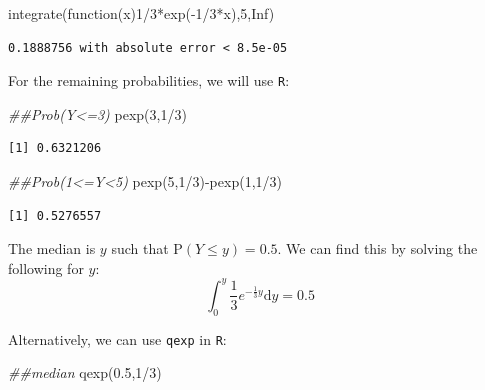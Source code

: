 \documentclass[
  letterpaper,
  DIV=11,
  numbers=noendperiod]{scrreprt}
\newenvironment{Shaded}{\begin{snugshade}}{\end{snugshade}}
\newcommand{\ConstantTok}[1]{\textcolor[rgb]{0.56,0.35,0.01}{#1}}
\newcommand{\ControlFlowTok}[1]{\textcolor[rgb]{0.00,0.23,0.31}{#1}}
\newcommand{\DecValTok}[1]{\textcolor[rgb]{0.68,0.00,0.00}{#1}}
\newcommand{\DocumentationTok}[1]{\textcolor[rgb]{0.37,0.37,0.37}{\textit{#1}}}
\newcommand{\FloatTok}[1]{\textcolor[rgb]{0.68,0.00,0.00}{#1}}
\newcommand{\FunctionTok}[1]{\textcolor[rgb]{0.28,0.35,0.67}{#1}}
\newcommand{\NormalTok}[1]{\textcolor[rgb]{0.00,0.23,0.31}{#1}}
\newcommand{\SpecialCharTok}[1]{\textcolor[rgb]{0.37,0.37,0.37}{#1}}
\begin{document}
\begin{Shaded}
\begin{Highlighting}[]
\FunctionTok{integrate}\NormalTok{(}\ControlFlowTok{function}\NormalTok{(x)}\DecValTok{1}\SpecialCharTok{/}\DecValTok{3}\SpecialCharTok{*}\FunctionTok{exp}\NormalTok{(}\SpecialCharTok{{-}}\DecValTok{1}\SpecialCharTok{/}\DecValTok{3}\SpecialCharTok{*}\NormalTok{x),}\DecValTok{5}\NormalTok{,}\ConstantTok{Inf}\NormalTok{)}
\end{Highlighting}
\end{Shaded}

\begin{verbatim}
0.1888756 with absolute error < 8.5e-05
\end{verbatim}

For the remaining probabilities, we will use \texttt{R}:

\begin{Shaded}
\begin{Highlighting}[]
\DocumentationTok{\#\#Prob(Y\textless{}=3)}
\FunctionTok{pexp}\NormalTok{(}\DecValTok{3}\NormalTok{,}\DecValTok{1}\SpecialCharTok{/}\DecValTok{3}\NormalTok{)}
\end{Highlighting}
\end{Shaded}

\begin{verbatim}
[1] 0.6321206
\end{verbatim}

\begin{Shaded}
\begin{Highlighting}[]
\DocumentationTok{\#\#Prob(1\textless{}=Y\textless{}5)}
\FunctionTok{pexp}\NormalTok{(}\DecValTok{5}\NormalTok{,}\DecValTok{1}\SpecialCharTok{/}\DecValTok{3}\NormalTok{)}\SpecialCharTok{{-}}\FunctionTok{pexp}\NormalTok{(}\DecValTok{1}\NormalTok{,}\DecValTok{1}\SpecialCharTok{/}\DecValTok{3}\NormalTok{)}
\end{Highlighting}
\end{Shaded}

\begin{verbatim}
[1] 0.5276557
\end{verbatim}

The median is \(y\) such that \(\mbox{P}(Y\leq y)=0.5\). We can find
this by solving the following for \(y\): \[
\int_0^y \frac{1}{3}e^{-\frac{1}{3}y}\mbox{d} y = 0.5
\]

Alternatively, we can use \texttt{qexp} in \texttt{R}:

\begin{Shaded}
\begin{Highlighting}[]
\DocumentationTok{\#\#median}
\FunctionTok{qexp}\NormalTok{(}\FloatTok{0.5}\NormalTok{,}\DecValTok{1}\SpecialCharTok{/}\DecValTok{3}\NormalTok{)}
\end{Highlighting}
\end{Shaded}
\end{document}

